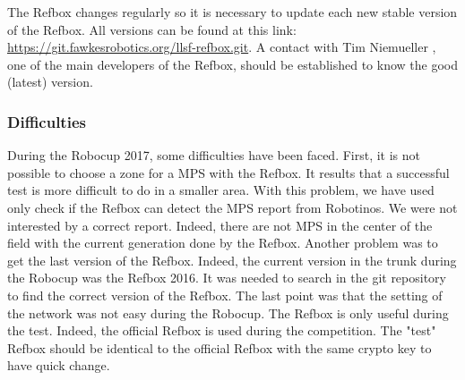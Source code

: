 The Refbox changes regularly so it is necessary to update each new stable version of the Refbox. All versions can be found at this link: \url{https://git.fawkesrobotics.org/llsf-refbox.git}. A contact with Tim Niemueller \cite{RCLL2017}, one of the main developers of the Refbox, should be established to know the good (latest) version. \\


\subsubsection{Difficulties}

During the Robocup 2017, some difficulties have been faced. First, it is not possible to choose a zone for a MPS with the Refbox. It results that a successful test is more difficult to do in a smaller area. With this problem, we have used only check if the Refbox can detect the MPS report from Robotinos. We were not interested by a correct report. Indeed, there are not MPS in the center of the field with the current generation done by the Refbox. Another problem was to get the last version of the Refbox. Indeed, the current version in the trunk during the Robocup was the Refbox 2016. It was needed to search in the git repository to find the correct version of the Refbox. The last point was that the setting of the network was not easy during the Robocup. The Refbox is only useful during the test. Indeed, the official Refbox is used during the competition. The "test" Refbox should be identical to the official Refbox with the same crypto key to have quick change. \\
